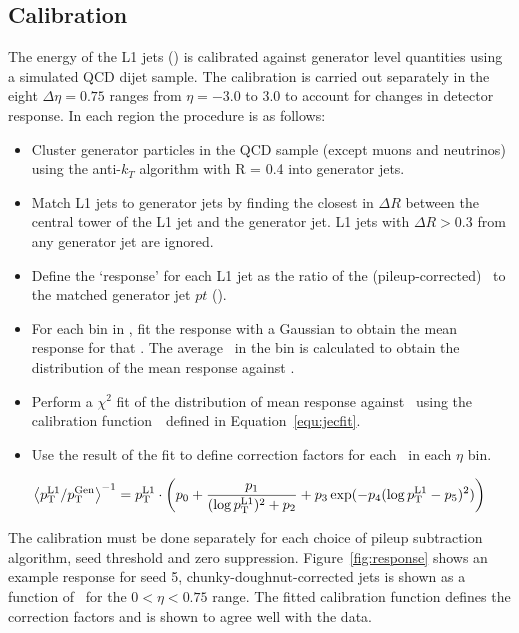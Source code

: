 \subsection{Calibration}
\label{sec:calib}
The energy of the L1 jets (\Lonept) is calibrated against generator level quantities using a simulated QCD dijet sample.
The calibration is carried out separately in the eight $\Delta\eta = 0.75$ ranges from $\eta=-3.0$ to $3.0$ 
to account for changes in detector response. In each region the procedure is as follows:

\begin{itemize}
\item Cluster generator particles in the QCD sample (except muons and neutrinos) using the anti-$k_T$ algorithm with R = 0.4 into generator jets.
\item Match L1 jets to generator jets by finding the closest in $\Delta R$ between the central tower of the L1 jet and the generator jet. L1 jets with 
$\Delta R > 0.3$ from any generator jet are ignored.
\item Define the `response' for each L1 jet as the ratio of the (pileup-corrected) \Lonept~to the matched generator jet $pt$ (\Genpt).
\item For each bin in \Genpt, fit the response with a Gaussian to obtain the mean response for that \Genpt. 
The average \Lonept~in the bin is calculated to obtain the distribution of the mean response against \Lonept.
\item Perform a $\chi^2$ fit of the distribution of mean response against \Lonept~using the calibration
 function~\cite{l1jet_calibration}~defined in Equation~\ref{equ:jecfit}.
\item Use the result of the fit to define correction factors for each \Lonept~in each $\eta$ bin.
\end{itemize}

\begin{equation}
\left<{p_{\text T}^{\text{L1}}}/{p_{\text T}^{\text{Gen}}}\right>^{-1} = {p_{\text T}^{\text{L1}}} \cdot \left ( p_{0} + 
\frac{p_{1}}{(\log {p_{\text T}^{\text{L1}}})^{2}+p_{2}}+p_{3} \exp(-p_{4}
(\log {p_{\text T}^{\text{L1}}}-p_{5} ) ^{2}) \right )
\label{equ:jecfit}
\end{equation}

The calibration must be done separately for each choice of pileup subtraction algorithm, seed threshold and zero suppression. 
Figure~\ref{fig:response} shows an example response for seed 5, chunky-doughnut-corrected jets is shown as a function of \Lonept~for 
the $0 < \eta < 0.75$ range. The fitted calibration function defines the correction 
factors and is shown to agree well with the data.


